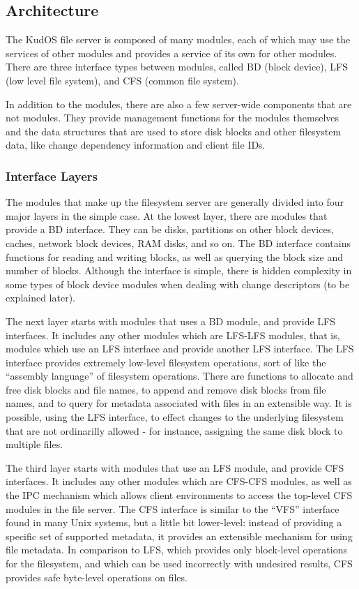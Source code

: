 \subsection{Architecture}
\label{subsec:arch}

The KudOS file server is composed of many modules, each of which may use the
services of other modules and provides a service of its own for other modules.
There are three interface types between modules, called BD (block device), LFS
(low level file system), and CFS (common file system).

In addition to the modules, there are also a few server-wide components that are
not modules. They provide management functions for the modules themselves and
the data structures that are used to store disk blocks and other filesystem
data, like change dependency information and client file IDs.

\subsubsection{Interface Layers}

The modules that make up the filesystem server are generally divided into four
major layers in the simple case. At the lowest layer, there are modules that
provide a BD interface. They can be disks, partitions on other block devices,
caches, network block devices, RAM disks, and so on. The BD interface contains
functions for reading and writing blocks, as well as querying the block size and
number of blocks. Although the interface is simple, there is hidden complexity
in some types of block device modules when dealing with change descriptors (to
be explained later).

The next layer starts with modules that uses a BD module, and provide LFS
interfaces. It includes any other modules which are LFS-LFS modules, that is,
modules which use an LFS interface and provide another LFS interface. The LFS
interface provides extremely low-level filesystem operations, sort of like the
``assembly language'' of filesystem operations. There are functions to allocate
and free disk blocks and file names, to append and remove disk blocks from file
names, and to query for metadata associated with files in an extensible way. It
is possible, using the LFS interface, to effect changes to the underlying
filesystem that are not ordinarilly allowed - for instance, assigning the same
disk block to multiple files.

The third layer starts with modules that use an LFS module, and provide CFS
interfaces. It includes any other modules which are CFS-CFS modules, as well as
the IPC mechanism which allows client environments to access the top-level CFS
modules in the file server. The CFS interface is similar to the ``VFS''
interface found in many Unix systems, but a little bit lower-level: instead of
providing a specific set of supported metadata, it provides an extensible
mechanism for using file metadata. In comparison to LFS, which provides only
block-level operations for the filesystem, and which can be used incorrectly
with undesired results, CFS provides safe byte-level operations on files.

